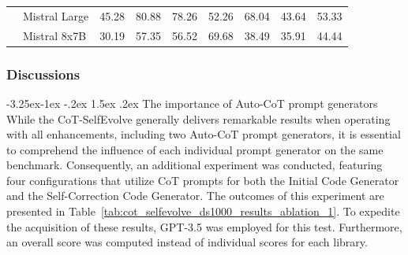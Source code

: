 \documentclass[a4paper,oneside]{book}
\makeatletter
\newcounter {subsubsubsection}[subsubsection]
\newcommand\subsubsubsection{\@startsection{subsubsubsection}{4}{\z@}%
                                    {-3.25ex\@plus -1ex \@minus -.2ex}%
                                    {1.5ex \@plus .2ex}%
                                    {\normalfont\normalsize\bfseries}}
\makeatother
\begin{document}
\begin{table}[H]
{\begin{tabular}{|l|l|c|c|c|c|c|c|c|}
                                                     & Mistral Large & 45.28                      & 80.88                        & 78.26                        & 52.26                           & 68.04                       & 43.64                      & 53.33                           \\ \cline{2-9}
                                                     & Mistral 8x7B  & 30.19                      & 57.35                        & 56.52                        & 69.68                           & 38.49                       & 35.91                      & 44.44                           \\ \hline
        \end{tabular}%
    }
\end{table}

\subsubsection{Discussions}
\subsubsubsection{The importance of Auto-CoT prompt generators}
While the CoT-SelfEvolve generally delivers remarkable results when operating with all enhancements, including two Auto-CoT prompt generators, it is essential to comprehend the influence of each individual prompt generator on the same benchmark. Consequently, an additional experiment was conducted, featuring four configurations that utilize CoT prompts for both the Initial Code Generator and the Self-Correction Code Generator. The outcomes of this experiment are presented in Table~\ref{tab:cot_selfevolve_ds1000_results_ablation_1}. To expedite the acquisition of these results, GPT-3.5 was employed for this test. Furthermore, an overall score was computed instead of individual scores for each library.
\end{document}
